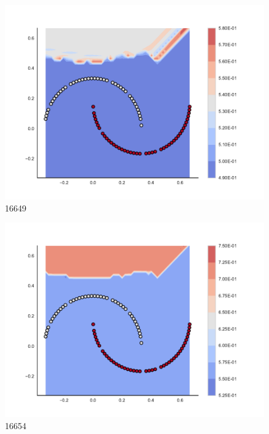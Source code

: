 \begin{subfigure}[b]{0.09\textwidth}
    \includegraphics[clip, trim=2.35cm 1.75cm 4.5cm 0cm,width=\textwidth]{img/convergence/16649.pdf}
    \caption{16649}
    \label{fig:convergence_16649}
\end{subfigure}
%
\begin{subfigure}[b]{0.09\textwidth}
    \includegraphics[clip, trim=2.35cm 1.75cm 4.5cm 0cm,width=\textwidth]{img/convergence/16654.pdf}
    \caption{16654}
    \label{fig:convergence_16654}
\end{subfigure}
%

